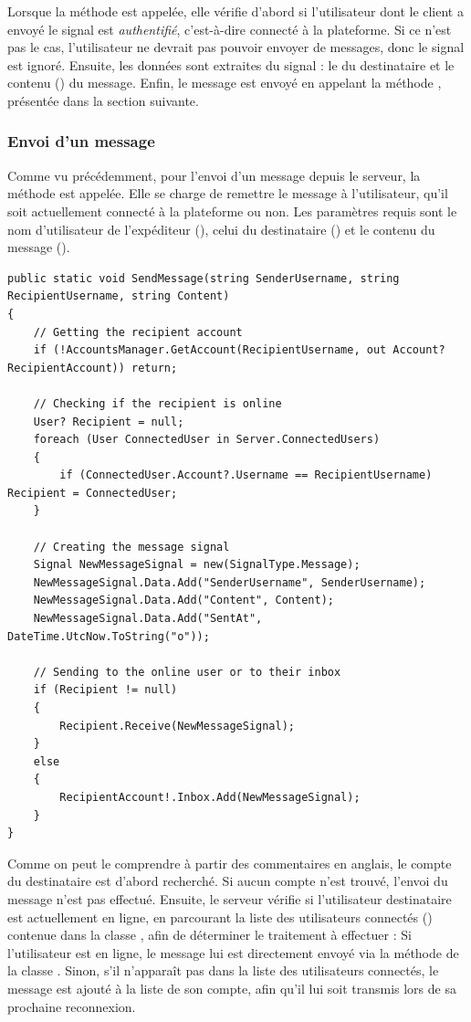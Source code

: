 \documentclass[12pt]{report}
\begin{document}
Lorsque la méthode est appelée, elle vérifie d’abord si l’utilisateur dont le client a envoyé le signal est \textit{authentifié}, c’est-à-dire connecté à la plateforme. Si ce n’est pas le cas, l’utilisateur ne devrait pas pouvoir envoyer de messages, donc le signal est ignoré.  
Ensuite, les données sont extraites du signal : le  du destinataire et le contenu () du message.  
Enfin, le message est envoyé en appelant la méthode , présentée dans la section suivante.

\subsubsection{Envoi d’un message}

Comme vu précédemment, pour l’envoi d’un message depuis le serveur, la méthode  est appelée. Elle se charge de remettre le message à l’utilisateur, qu’il soit actuellement connecté à la plateforme ou non. Les paramètres requis sont le nom d’utilisateur de l’expéditeur (), celui du destinataire () et le contenu du message ().

\begin{verbatim}
public static void SendMessage(string SenderUsername, string RecipientUsername, string Content)
{
	// Getting the recipient account
	if (!AccountsManager.GetAccount(RecipientUsername, out Account? RecipientAccount)) return;
	
	// Checking if the recipient is online
	User? Recipient = null;
	foreach (User ConnectedUser in Server.ConnectedUsers)
	{
		if (ConnectedUser.Account?.Username == RecipientUsername) Recipient = ConnectedUser;
	}
	
	// Creating the message signal
	Signal NewMessageSignal = new(SignalType.Message);
	NewMessageSignal.Data.Add("SenderUsername", SenderUsername);
	NewMessageSignal.Data.Add("Content", Content);
	NewMessageSignal.Data.Add("SentAt", DateTime.UtcNow.ToString("o"));
	
	// Sending to the online user or to their inbox
	if (Recipient != null)
	{
		Recipient.Receive(NewMessageSignal);
	}
	else
	{
		RecipientAccount!.Inbox.Add(NewMessageSignal);
	}
}
\end{verbatim}

Comme on peut le comprendre à partir des commentaires en anglais, le compte  du destinataire est d’abord recherché. Si aucun compte n’est trouvé, l’envoi du message n’est pas effectué.  
Ensuite, le serveur vérifie si l’utilisateur destinataire est actuellement en ligne, en parcourant la liste des utilisateurs connectés () contenue dans la classe , afin de déterminer le traitement à effectuer :  
Si l’utilisateur est en ligne, le message lui est directement envoyé via la méthode  de la classe .  
Sinon, s’il n’apparaît pas dans la liste des utilisateurs connectés, le message est ajouté à la liste  de son compte, afin qu’il lui soit transmis lors de sa prochaine reconnexion.
\end{document}
